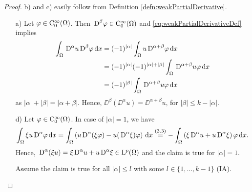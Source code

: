 \begin{proof}
  b) and c) easily follow from Definition \ref{defn:weakPartialDerivative}.

  \begin{enumerate}
  \item[a)] Let $\varphi \in \mathrm{C}_0^\infty(\Omega)$. 
    Then $\,{\operatorname{D}}^\beta \varphi \in \mathrm{C}_0^\infty(\Omega)$ and \eqref{eq:weakPartialDerivativeDef} implies
  \begin{align*}
    \int_\Omega \,{\operatorname{D}}^\alpha u \,{\operatorname{D}}^\beta \varphi \, {\operatorname{d}\!{x}}
    &= (-1)^{|\alpha|} \int_\Omega u \,{\operatorname{D}}^{\alpha + \beta} \varphi \, {\operatorname{d}\!{x}} \\
    &= (-1)^{|\alpha|} (-1)^{|\alpha| + |\beta|} \int_\Omega \,{\operatorname{D}}^{\alpha + \beta} u \varphi \, {\operatorname{d}\!{x}} \\
    &= (-1)^{|\beta|} \int_\Omega \,{\operatorname{D}}^{\alpha + \beta} u \varphi \, {\operatorname{d}\!{x}}
  \end{align*}
  as $|\alpha| + |\beta| = |\alpha + \beta|$.
      Hence, $\DD^\beta(\DD^\alpha u) = \DD^{\alpha + \beta} u$, for $|\beta| \leq k - |\alpha|$.

    \item[d)] Let $\varphi \in \mathrm{C}_0^\infty(\Omega)$. 
      In case of $|\alpha| = 1$, we have
      $$
      \int_\Omega \xi u \,{\operatorname{D}}^\alpha \varphi \, {\operatorname{d}\!{x}} = \int_\Omega \left( u \,{\operatorname{D}}^\alpha(\xi \varphi) - u(\,{\operatorname{D}}^\alpha \xi) \varphi \right) \, {\operatorname{d}\!{x}} \overset{(3.3)}{=} -\int_\Omega \left( \xi \,{\operatorname{D}}^\alpha u + u \,{\operatorname{D}}^\alpha \xi \right) \varphi \, {\operatorname{d}\!{x}}.
      $$
      Hence, $\,{\operatorname{D}}^\alpha(\xi u) = \xi \,{\operatorname{D}}^\alpha u + u \,{\operatorname{D}}^\alpha \xi \in \mathrm{L}^p(\Omega)$ and the claim is true for $|\alpha| = 1$.

      Assume the claim is true for all $|\alpha| \leq l$ with some $l \in \{1,\dots,k-1\}$ (IA).


\end{enumerate}
\end{proof}
